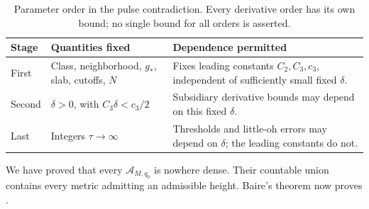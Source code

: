 \begin{table}[H]
\centering
\small
\renewcommand{\arraystretch}{1.18}
\begin{tabular}{@{}p{}p{}p{}@{}}
\hline
Stage & Quantities fixed & Dependence permitted\\
\hline
First & Class, neighborhood, \(g_*\), slab, cutoffs, \(N\)
& Fixes leading constants \(C_2,C_3,c_3\), independent of
sufficiently small fixed \(\delta\).\\
Second & \(\delta>0\), with \(C_3\delta<c_3/2\)
& Subsidiary derivative bounds may depend on this fixed \(\delta\).\\
Last & Integers \(\tau\to\infty\)
& Thresholds and little-oh errors may depend on \(\delta\);
the leading constants do not.\\
\hline
\end{tabular}
\caption{Parameter order in the pulse contradiction. Every derivative
order has its own bound; no single bound for all orders is asserted.}
\label{tab:pulse-choices}
\end{table}

We have proved that every \(\mathcal A_{M,q_0}\) is nowhere dense.
Their countable union contains every metric admitting an admissible
height. Baire's theorem now proves .
